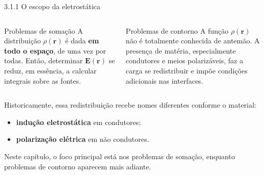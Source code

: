 \documentclass[aspectratio=169,11pt]{beamer}
\newcommand{\E}{\mathbf{E}}
\newcommand{\rr}{\mathbf{r}}
\begin{document}
\begin{frame}{3.1.1 O escopo da eletrostática}
\begin{columns}[T,onlytextwidth]
\begin{block}{Problemas de somação}
\justifying
A distribuição \(\rho(\rr)\) é dada \textbf{em todo o espaço}, de uma vez por todas.
Então, determinar \(\E(\rr)\) se reduz, em essência, a calcular integrais sobre as fontes.
\end{block}

\begin{block}{Problemas de contorno}
\justifying
A função \(\rho(\rr)\) não é totalmente conhecida de antemão. 
A presença de matéria, especialmente condutores e meios polarizáveis, faz a carga se redistribuir e impõe condições adicionais nas interfaces.
\end{block}
\end{columns}

\vspace{0.25cm}

\begin{mybox}
\justifying
Historicamente, essa redistribuição recebe nomes diferentes conforme o material:
\begin{itemize}
    \item \textbf{indução eletrostática} em condutores;
    \item \textbf{polarização elétrica} em não condutores.
\end{itemize}
Neste capítulo, o foco principal está nos \alert{problemas de somação}, enquanto problemas de contorno aparecem mais adiante.
\end{mybox}
\end{frame}
\end{document}
